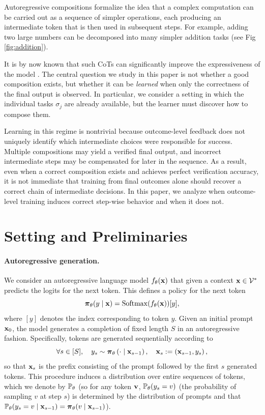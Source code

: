 \documentclass{article}
\theoremstyle{plain}
\theoremstyle{definition}
\theoremstyle{remark}
\begin{document}
Autoregressive compositions formalize the idea that a complex computation can be carried out as a sequence of simpler operations, each producing an intermediate token that is then used in subsequent steps. For example, adding two large numbers can be decomposed into many simpler addition tasks (see Fig \ref{fig:addition}).

It is by now known that such CoTs can significantly improve the expressiveness of the model \citep{malach2023auto, merrillexpressive}. The central question we study in this paper is not whether a good composition exists, but whether it can be \emph{learned} when only the correctness of the final output is observed. In particular, we consider a setting in which the individual tasks $\sigma_j$ are already available, but the learner must discover how to compose them.

Learning in this regime is nontrivial because outcome-level feedback does not uniquely identify which intermediate choices were responsible for success. Multiple compositions may yield a verified final output, and incorrect intermediate steps may be compensated for later in the sequence. As a result, even when a correct composition exists and achieves perfect verification accuracy, it is not immediate that training from final outcomes alone should recover a correct chain of intermediate decisions. In this paper, we analyze when outcome-level training induces correct step-wise behavior and when it does not.


\section{Setting and Preliminaries}\label{sec: setting}
\paragraph{Autoregressive generation.} 
We consider an autoregressive language model $f_\theta(\bx)$ that given a context $\bx \in \Vcal^*$ predicts the logits for the next token. This defines a policy for the next token
\[
\bpi_\theta(y \mid \bx) = \SM(f_\theta(\bx))[y],
\]
where $[y]$ denotes the index corresponding to token $y$. 
Given an initial prompt $\bx_0$, the model generates a completion of fixed length $S$ in an autoregressive fashion. Specifically, tokens are generated sequentially according to
\[
    \forall s \in [S], \quad
    y_s \sim \bpi_\theta \left(\cdot \mid \bx_{s-1}\right), \quad
    \bx_s := \left(\bx_{s-1}, y_s\right),
\]
so that $\bx_s$ is the prefix consisting of the prompt followed by the first $s$ generated tokens. This procedure induces a distribution over entire sequences of tokens, which we denote by $\P_\theta$ (so for any token $\bv$, $\P_{\theta}(y_s = v)$ (the probability of sampling $v$ at step $s$) is determined by the distribution of prompts and that $\P_{\theta}(y_s = v \mid \bx_{s-1}) = \bpi_\theta(v\mid \bx_{s-1})$).
\end{document}
